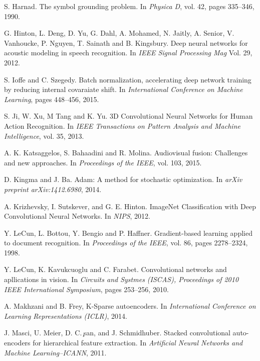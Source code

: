 \begin{thebibliography}{99}
  S. Harnad. The symbol grounding problem. In \textit{Physica D}, vol. 42,
  pages 335–346, 1990.

  G. Hinton, L. Deng, D. Yu, G. Dahl, A. Mohamed, N. Jaitly, A. Senior, V.
  Vanhoucke, P. Nguyen, T. Sainath and B. Kingsbury. Deep neural networks
  for acoustic modeling in speech recognition.
  In \textit{IEEE Signal Processing Mag} Vol. 29, 2012.

  S. Ioffe and C. Szegedy. Batch normalization, accelerating deep network
  training by reducing internal covaraiate shift. In \textit{International
  Conference on Machine Learning}, pages 448--456, 2015.

  S. Ji, W. Xu, M Tang and K. Yu. 3D Convolutional Neural Networks
  for Human Action Recognition. In \textit{IEEE Transactions on Pattern
  Analysis and Machine Intelligence}, vol. 35, 2013.

  A. K. Katsaggelos, S. Bahaadini and R. Molina. Audiovisual fusion:
  Challenges and new approaches. In \textit{Proceedings of the IEEE},
  vol. 103, 2015.

  D. Kingma and J. Ba. Adam: A method for stochastic optimization.
  In \textit{arXiv preprint arXiv:1412.6980}, 2014.

  A. Krizhevsky, I. Sutskever, and G. E. Hinton.  ImageNet Classification
  with Deep Convolutional Neural Networks. In \textit{NIPS}, 2012.

  Y. LeCun, L. Bottou, Y. Bengio and P. Haffner. Gradient-based
  learning applied to document recognition. In \textit{Proceedings of the
  IEEE}, vol. 86, pages 2278--2324, 1998.

  Y. LeCun, K. Kavukcuoglu and C. Farabet. Convolutional networks and
  apllications in vision. In \textit{Circuits and Systmes (ISCAS), 
  Proceedings of 2010 IEEE International Symposium}, pages 253--256, 2010.

  A. Makhzani and B. Frey, K-Sparse autoencoders. In \textit{International
  Conference on Learning Representations (ICLR)}, 2014.

  J. Masci, U. Meier, D. C. ̧san, and J. Schmidhuber.
  Stacked convolutional auto-encoders for hierarchical feature extraction.
  In \textit{Artificial Neural Networks and Machine Learning–ICANN}, 2011.


\end{thebibliography}
